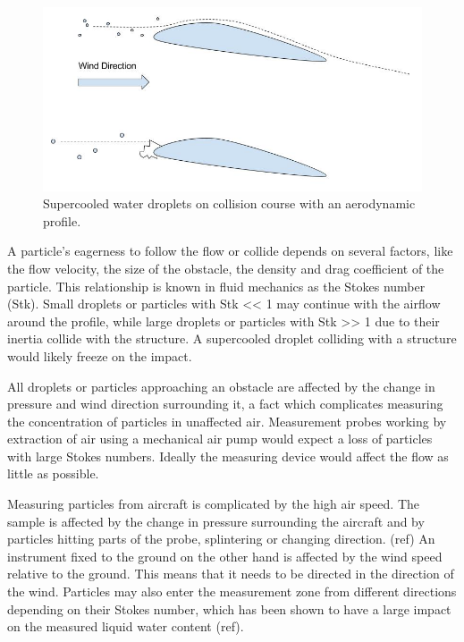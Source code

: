 \begin{figure}%
\centering\includegraphics[width=0.6\linewidth]{figures/freezing_droplets}
\caption{Supercooled water droplets on collision course with an aerodynamic profile.}
\end{figure}


A particle’s eagerness to follow the flow or collide depends on several factors, like the flow velocity, the size of the obstacle, the density and drag coefficient of the particle. This relationship is known in fluid mechanics as the Stokes number (Stk). Small droplets or particles with Stk << 1 may continue with the airflow around the profile, while large droplets or particles with Stk >> 1 due to their inertia collide with the structure. A supercooled droplet colliding with a structure would likely freeze on the impact.

All droplets or particles approaching an obstacle are affected by the change in pressure and wind direction surrounding it, a fact which complicates measuring the concentration of particles in unaffected air. Measurement probes working by extraction of air using a mechanical air pump would expect a loss of particles with large Stokes numbers. Ideally the measuring device would affect the flow as little as possible.

Measuring particles from aircraft is complicated by the high air speed. The sample is affected by the change in pressure surrounding the aircraft and by particles hitting parts of the probe, splintering or changing direction. (ref) An instrument fixed to the ground on the other hand is affected by the wind speed relative to the ground. This means that it needs to be directed in the direction of the wind. Particles may also enter the measurement zone from different directions depending on their Stokes number, which has been shown to have a large impact on the measured liquid water content (ref).

